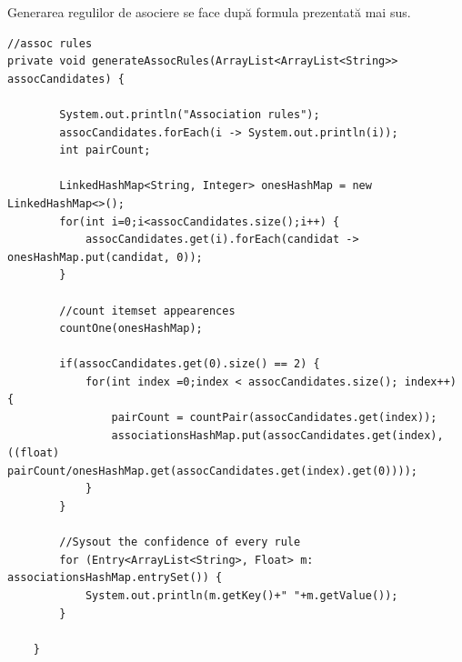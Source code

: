 \documentclass[11pt]{diazessay} %
\begin{document}
Generarea regulilor de asociere se face după formula prezentată mai sus.

\begin{lstlisting}
//assoc rules
private void generateAssocRules(ArrayList<ArrayList<String>> assocCandidates) {
	
		System.out.println("Association rules");
		assocCandidates.forEach(i -> System.out.println(i));
		int pairCount;
		
		LinkedHashMap<String, Integer> onesHashMap = new LinkedHashMap<>();
		for(int i=0;i<assocCandidates.size();i++) {
			assocCandidates.get(i).forEach(candidat -> onesHashMap.put(candidat, 0));
		}
		
		//count itemset appearences
		countOne(onesHashMap);
		
		if(assocCandidates.get(0).size() == 2) {
			for(int index =0;index < assocCandidates.size(); index++) {
				pairCount = countPair(assocCandidates.get(index));
				associationsHashMap.put(assocCandidates.get(index), ((float) pairCount/onesHashMap.get(assocCandidates.get(index).get(0))));
			}
		}
		
		//Sysout the confidence of every rule
		for (Entry<ArrayList<String>, Float> m: associationsHashMap.entrySet()) { 
			System.out.println(m.getKey()+" "+m.getValue()); 
		} 
	
	}
\end{lstlisting}






\end{document}
